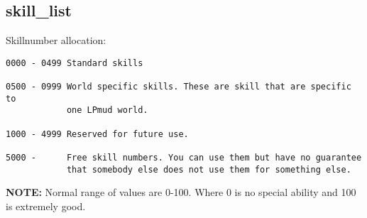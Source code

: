 \subsection{skill\_list}


Skillnumber allocation:

\begin{verbatim}
0000 - 0499 Standard skills

0500 - 0999 World specific skills. These are skill that are specific to
            one LPmud world. 

1000 - 4999 Reserved for future use.

5000 -      Free skill numbers. You can use them but have no guarantee
            that somebody else does not use them for something else.
\end{verbatim}

{\bf NOTE:}
    Normal range of values are 0-100. Where 0 is no special ability 
    and 100 is extremely good.

